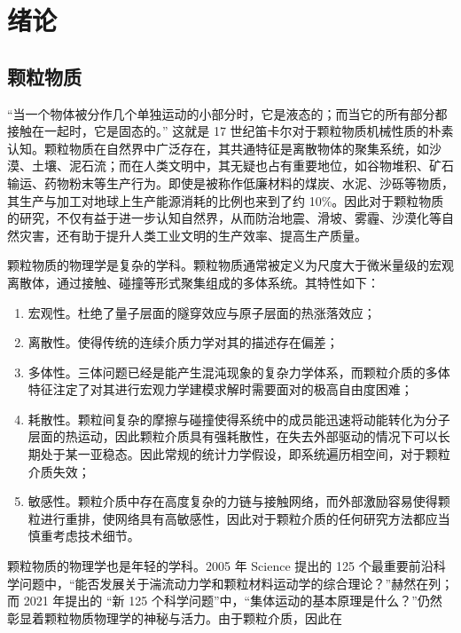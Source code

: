 
\chapter{绪论}

\section{颗粒物质}

“当一个物体被分作几个单独运动的小部分时，它是液态的；而当它的所有部分都接触在一起时，它是固态的。” 这就是 17 世纪笛卡尔对于颗粒物质机械性质的朴素认知。颗粒物质在自然界中广泛存在，其共通特征是离散物体的聚集系统，如沙漠、土壤、泥石流；而在人类文明中，其无疑也占有重要地位，如谷物堆积、矿石输运、药物粉末等生产行为。即使是被称作低廉材料的煤炭、水泥、沙砾等物质，其生产与加工对地球上生产能源消耗的比例也来到了约 \num{10}\%\cite{duran2000sands}。因此对于颗粒物质的研究，不仅有益于进一步认知自然界，从而防治地震、滑坡、雾霾、沙漠化等自然灾害，还有助于提升人类工业文明的生产效率、提高生产质量。

颗粒物质的物理学是复杂的学科。颗粒物质通常被定义为尺度大于微米量级的宏观离散体，通过接触、碰撞等形式聚集组成的多体系统。其特性如下：

\begin{enumerate}
  \item 宏观性。杜绝了量子层面的隧穿效应与原子层面的热涨落效应；
  \item 离散性。使得传统的连续介质力学对其的描述存在偏差\cite{RevModPhys.71.435}；
  \item 多体性。三体问题已经是能产生混沌现象的复杂力学体系，而颗粒介质的多体特征注定了对其进行宏观力学建模求解时需要面对的极高自由度困难；
  \item 耗散性。颗粒间复杂的摩擦与碰撞使得系统中的成员能迅速将动能转化为分子层面的热运动，因此颗粒介质具有强耗散性，在失去外部驱动的情况下可以长期处于某一亚稳态。因此常规的统计力学假设，即系统遍历相空间，对于颗粒介质失效；
  \item 敏感性。颗粒介质中存在高度复杂的力链与接触网络，而外部激励容易使得颗粒进行重排，使网络具有高敏感性，因此对于颗粒介质的任何研究方法都应当慎重考虑技术细节。
\end{enumerate}

颗粒物质的物理学也是年轻的学科。2005 年 Science 提出的 125 个最重要前沿科学问题\cite{doi:10.1126/science.309.5731.78b}中，“能否发展关于湍流动力学和颗粒材料运动学的综合理论？”赫然在列；而 2021 年提出的 “新 125 个科学问题”\cite{sanders2021125}中，“集体运动的基本原理是什么？”仍然彰显着颗粒物质物理学的神秘与活力。由于颗粒介质，因此在 

